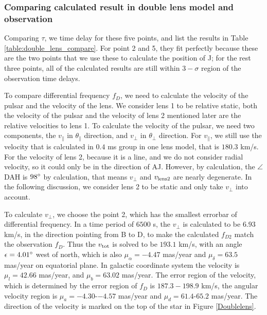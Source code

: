 \documentclass[useAMS,usenatbib]{mn2e}
\begin{document}
\subsubsection{Comparing calculated result in double lens model and observation}
Comparing $\tau$, we time delay for these five points, and list the results in Table \ref{table:double_lens_compare}. For point 2 and 5, they fit perfectly because these are the two points that we use these to calculate the position of J; for the rest three points, all of the calculated results are still within $3-\sigma$ region of the observation time delays.

To compare differential frequency $f_D$, we need to calculate the velocity of the pulsar and the velocity of the lens. We consider lens 1 to be relative static, both the velocity of the pulsar and the velocity of lens 2 mentioned later are the relative velocities to lens 1.
To calculate the velocity of the pulsar, we need two components, the $v_{\parallel}$ in $\theta_{\parallel}$ direction, and $v_{\bot}$ in $\theta_{\bot}$ direction. For $v_{\parallel}$, we still use the velocity that is calculated in $0.4$ ms group in one lens model, that is $180.3$ km/s. For the velocity of lens 2, because it is a line, and we do not consider radial velocity, so it could only be in the direction of AJ. However, by calculation, the $\angle$DAH is $98\degree$ by calculation, that means $v_{\bot}$ and $v_{\rm lens2}$ are nearly degenerate. In the following discussion, we consider lens 2 to be static and only take $v_{\bot}$ into account.

To calculate $v_{\bot}$, we choose the point 2, which has the smallest errorbar of differential frequency. In a time period of $6500$ s, the $v_{\bot}$ is calculated to be $6.93$ km/s, in the direction pointing from B to D, to make the calculated $f_{D2}$ match the observation $f_D$. Thus the $v_{\rm tot}$ is solved to be $193.1$ km/s, with an angle $\epsilon=4.01\degree$ west of north, which is also $\mu_\alpha=-4.47$ mas/year and $\mu_\delta=63.5$ mas/year on equatorial plane. In galactic coordinate system the velocity is $\mu_l=42.66$ mas/year, and $\mu_b=63.02$ mas/year. %
The error region of the velocity, which is determined by the error region of $f_D$ is $187.3-198.9$ km/s, the angular velocity region is $\mu_a=-4.30$-$-4.57$ mas/year and $\mu_d=61.4$-$65.2$ mas/year. The direction of the velocity is marked on the top of the star in Figure \ref{Doublelens}.
\end{document}

